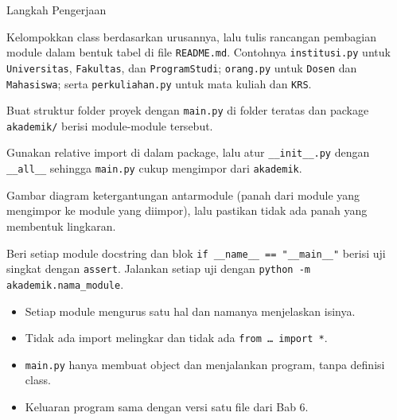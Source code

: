 \begin{langkah}{Langkah Pengerjaan}
  \item Kelompokkan class berdasarkan urusannya, lalu tulis rancangan pembagian module dalam bentuk tabel di file \texttt{README.md}. Contohnya \texttt{institusi.py} untuk \texttt{Universitas}, \texttt{Fakultas}, dan \texttt{ProgramStudi}; \texttt{orang.py} untuk \texttt{Dosen} dan \texttt{Mahasiswa}; serta \texttt{perkuliahan.py} untuk mata kuliah dan \texttt{KRS}.
  \item Buat struktur folder proyek dengan \texttt{main.py} di folder teratas dan package \texttt{akademik/} berisi module-module tersebut.
  \item Gunakan relative import di dalam package, lalu atur \texttt{\_\_init\_\_.py} dengan \texttt{\_\_all\_\_} sehingga \texttt{main.py} cukup mengimpor dari \texttt{akademik}.
  \item Gambar diagram ketergantungan antarmodule (panah dari module yang mengimpor ke module yang diimpor), lalu pastikan tidak ada panah yang membentuk lingkaran.
  \item Beri setiap module docstring dan blok \texttt{if \_\_name\_\_ == "\_\_main\_\_"} berisi uji singkat dengan \texttt{assert}. Jalankan setiap uji dengan \texttt{python -m akademik.nama\_module}.
\end{langkah}

\begin{penting}
\begin{itemize}
  \item Setiap module mengurus satu hal dan namanya menjelaskan isinya.
  \item Tidak ada import melingkar dan tidak ada \texttt{from \ldots\ import *}.
  \item \texttt{main.py} hanya membuat object dan menjalankan program, tanpa definisi class.
  \item Keluaran program sama dengan versi satu file dari Bab 6.
\end{itemize}
\end{penting}